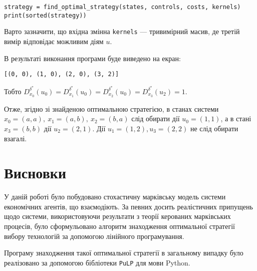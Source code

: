 \documentclass[oneside,14pt]{extarticle}
\begin{document}
\begin{example}
\begin{lstlisting}
strategy = find_optimal_strategy(states, controls, costs, kernels)
print(sorted(strategy))
\end{lstlisting}

Варто зазначити, що вхідна змінна \texttt{kernels} — тривимірний масив, де третій вимір відповідає можливим діям \(u\).

В результаті виконання програми буде виведено на екран:
\begin{lstlisting}
[(0, 0), (1, 0), (2, 0), (3, 2)]
\end{lstlisting}
Тобто \(D_{x_0}^{\delta^{*}}(u_0) = D_{x_1}^{\delta^*}(u_0) = D_{x_2}^{\delta^*}(u_0) = D_{x_3}^{\delta^*}(u_2) = 1 \).

Отже, згідно зі знайденою оптимальною стратегією, в станах системи \(x_0 = (a, a),\ x_1 = (a, b),\ x_2 = (b, a)\) слід обирати дії \(u_0 = (1, 1)\), а в стані \(x_3 = (b, b)\) дії \(u_2 = (2, 1)\). Дії \(u_1 = (1, 2	), u_3 = (2, 2)\) не слід обирати взагалі. \end{example}

\clearpage
\section{Висновки}
У даній роботі було побудовано стохастичну марківську модель системи економічних агентів, що взаємодіють. За певних досить реалістичних припущень щодо системи, використовуючи результати з теорії керованих марківських процесів, було сформульовано алгоритм знаходження оптимальної стратегії вибору технологій за допомогою лінійного програмування.

Програму знаходження такої оптимальної стратегії в загальному випадку було реалізовано за допомогою бібліотеки \texttt{PuLP} для мови Python.

\clearpage


\nocite{David:1998}
\nocite{Knopov:2011}
\nocite{Knopov:1998}
\nocite{Chornei:2005}
\nocite{Koller:2009}

\renewcommand\bibname{Посилання}


\end{document}
